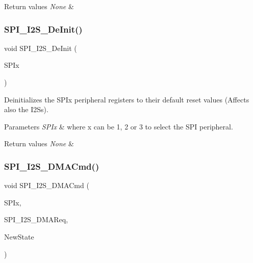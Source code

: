 \begin{DoxyRetVals}{Return values}
{\em None} & \\
\hline
\end{DoxyRetVals}
\mbox{\label{group___s_p_i___private___functions_gabe36880945fa56785283a9c0092124cc}} 
\subsubsection{\texorpdfstring{SPI\_I2S\_DeInit()}{SPI\_I2S\_DeInit()}}
{\footnotesize\ttfamily void S\+P\+I\+\_\+\+I2\+S\+\_\+\+De\+Init (\begin{DoxyParamCaption}\item[{\mbox{\hyperlink{struct_s_p_i___type_def}{S\+P\+I\+\_\+\+Type\+Def}} $\ast$}]{S\+P\+Ix }\end{DoxyParamCaption})}



Deinitializes the S\+P\+Ix peripheral registers to their default reset values (Affects also the I2\+Ss). 


\begin{DoxyParams}{Parameters}
{\em S\+P\+Ix} & where x can be 1, 2 or 3 to select the S\+PI peripheral. \\
\hline
\end{DoxyParams}

\begin{DoxyRetVals}{Return values}
{\em None} & \\
\hline
\end{DoxyRetVals}
\mbox{\label{group___s_p_i___private___functions_gabed5b91a8576e6d578f364cc0e807e4a}} 
\subsubsection{\texorpdfstring{SPI\_I2S\_DMACmd()}{SPI\_I2S\_DMACmd()}}
{\footnotesize\ttfamily void S\+P\+I\+\_\+\+I2\+S\+\_\+\+D\+M\+A\+Cmd (\begin{DoxyParamCaption}\item[{\mbox{\hyperlink{struct_s_p_i___type_def}{S\+P\+I\+\_\+\+Type\+Def}} $\ast$}]{S\+P\+Ix,  }\item[{uint16\+\_\+t}]{S\+P\+I\+\_\+\+I2\+S\+\_\+\+D\+M\+A\+Req,  }\item[{\mbox{\hyperlink{group___exported__types_gac9a7e9a35d2513ec15c3b537aaa4fba1}{Functional\+State}}}]{New\+State }\end{DoxyParamCaption})}



